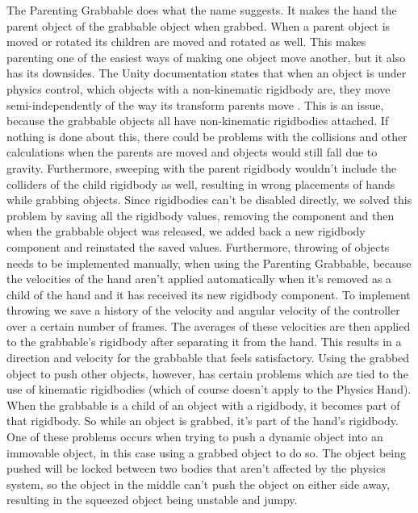 The Parenting Grabbable does what the name suggests. It makes the hand the parent object of the grabbable object when grabbed. When a parent object is moved or rotated its children are moved and rotated as well. This makes parenting one of the easiest ways of making one object move another, but it also has its downsides. The Unity documentation states that when an object is under physics control, which objects with a non-kinematic rigidbody are, they move semi-independently of the way its transform parents move \parencite{UnityManualRigidbody2017}. This is an issue, because the grabbable objects all have non-kinematic rigidbodies attached. If nothing is done about this, there could be problems with the collisions and other calculations when the parents are moved and objects would still fall due to gravity. Furthermore, sweeping with the parent rigidbody wouldn't include the colliders of the child rigidbody as well, resulting in wrong placements of hands while grabbing objects. Since rigidbodies can't be disabled directly, we solved this problem by saving all the rigidbody values, removing the component and then when the grabbable object was released, we added back a new rigidbody component and reinstated the saved values. Furthermore, throwing of objects needs to be implemented manually, when using the Parenting Grabbable, because the velocities of the hand aren't applied automatically when it's removed as a child of the hand and it has received its new rigidbody component. To implement throwing we save a history of the velocity and angular velocity of the controller over a certain number of frames. The averages of these velocities are then applied to the grabbable's rigidbody after separating it from the hand. This results in a direction and velocity for the grabbable that feels satisfactory. Using the grabbed object to push other objects, however, has certain problems which are tied to the use of kinematic rigidbodies (which of course doesn't apply to the Physics Hand). When the grabbable is a child of an object with a rigidbody, it becomes part of that rigidbody. So while an object is grabbed, it's part of the hand's rigidbody. One of these problems occurs when trying to push a dynamic object into an immovable object, in this case using a grabbed object to do so. The object being pushed will be locked between two bodies that aren't affected by the physics system, so the object in the middle can't push the object on either side away, resulting in the squeezed object being unstable and jumpy.

